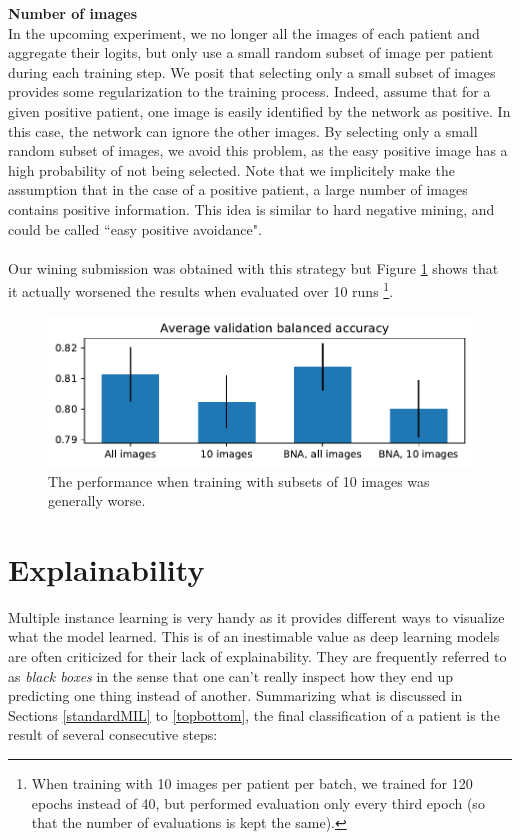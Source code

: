 \documentclass[final]{cvpr}
\begin{document}
	\noindent
	\textbf{Number of images}\\	
	In the upcoming experiment, we  no longer all the images of each patient and aggregate their logits, but only use a small random subset of image per patient during each training step. 	We posit that selecting only a small subset of images provides some regularization to the training process. Indeed, assume that for a given positive patient, one image is easily identified by the network as positive. In this case, the network can ignore the other images. By selecting only a small random subset of images, we avoid this problem, as the easy positive image has a high probability of not being selected. Note that we implicitely make the assumption that in the case of a positive patient, a large number of images contains positive information. This idea is similar to hard negative mining, and could be called ``easy positive avoidance".\\
	\\
	Our wining submission was obtained with this strategy but Figure \ref{fig:num_img} shows that it actually worsened the results when evaluated over 10 runs \footnote{When training with 10 images per patient per batch, we trained for 120 epochs instead of 40, but performed evaluation only every third epoch (so that the number of evaluations is kept the same).}.
	
	\begin{figure}[t]
		\begin{center}
			\includegraphics[width=0.95\linewidth]{fig/num_img_bal_acc.pdf}
		\end{center}
		\caption{The performance when training with subsets of 10 images was generally worse.}
		\label{fig:num_img}
	\end{figure}
	
	\section{Explainability}
	
	Multiple instance learning is very handy as it provides different ways to visualize what the model learned. This is of an inestimable value as deep learning models are often criticized for their lack of explainability. They are frequently referred to as \textit{black boxes} in the sense that one can’t really inspect how they end up predicting one thing instead of another. Summarizing what is discussed in Sections \ref{standardMIL} to \ref{topbottom}, the final classification of a patient is the result of several consecutive steps:
	
\end{document}
